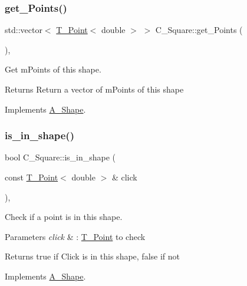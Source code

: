 \subsubsection{\texorpdfstring{get\+\_\+\+Points()}{get\_Points()}}
{\footnotesize\ttfamily std\+::vector$<$ \hyperlink{classPoint}{T_Point}$<$ double $>$ $>$ C_Square\+::get\+\_\+\+Points (\begin{DoxyParamCaption}{ }\end{DoxyParamCaption})\hspace{0.3cm}{\ttfamily [override]}, {\ttfamily [virtual]}}



Get mPoints of this shape.

\begin{DoxyReturn}{Returns}
Return a vector of mPoints of this shape
\end{DoxyReturn}


Implements \hyperlink{classShape_add74a5c682840fa4a519242b1ddbd0b5}{A_Shape}.

\mbox{\label{classSquare_ada046df2d9fb92286d106d4b3475980a}} 
\subsubsection{\texorpdfstring{is\+\_\+in\+\_\+shape()}{is\_in\_shape()}}
{\footnotesize\ttfamily bool C_Square\+::is\+\_\+in\+\_\+shape (\begin{DoxyParamCaption}\item[{const \hyperlink{classPoint}{T_Point}$<$ double $>$ \&}]{click }\end{DoxyParamCaption})\hspace{0.3cm}{\ttfamily [override]}, {\ttfamily [virtual]}}



Check if a point is in this shape. 


\begin{DoxyParams}{Parameters}
{\em click} & \+: \hyperlink{classPoint}{T_Point} to check \\
\hline
\end{DoxyParams}
\begin{DoxyReturn}{Returns}
true if Click is in this shape, false if not
\end{DoxyReturn}


Implements \hyperlink{classShape_aa09a621da090e42840b4bec7ffb27620}{A_Shape}.

